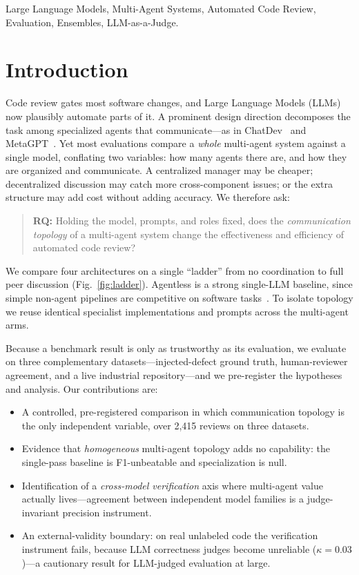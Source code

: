 \documentclass[conference]{IEEEtran}
\begin{document}
\begin{IEEEkeywords}
Large Language Models, Multi-Agent Systems, Automated Code Review, Evaluation,
Ensembles, LLM-as-a-Judge.
\end{IEEEkeywords}

\section{Introduction}
Code review gates most software changes, and Large Language Models (LLMs) now
plausibly automate parts of it. A prominent design direction decomposes the task
among specialized agents that communicate---as in ChatDev~\cite{chatdev} and
MetaGPT~\cite{metagpt}. Yet most evaluations compare a \emph{whole} multi-agent
system against a single model, conflating two variables: how many agents there
are, and how they are organized and communicate. A centralized manager may be
cheaper; decentralized discussion may catch more cross-component issues; or the
extra structure may add cost without adding accuracy. We therefore ask:

\begin{quote}
\textbf{RQ:} Holding the model, prompts, and roles fixed, does the
\emph{communication topology} of a multi-agent system change the effectiveness
and efficiency of automated code review?
\end{quote}

We compare four architectures on a single ``ladder'' from no coordination to
full peer discussion (Fig.~\ref{fig:ladder}). Agentless is a strong single-LLM
baseline, since simple non-agent pipelines are competitive on software
tasks~\cite{agentless}. To isolate topology we reuse identical specialist
implementations and prompts across the multi-agent arms.

Because a benchmark result is only as trustworthy as its evaluation, we evaluate
on three complementary datasets---injected-defect ground truth, human-reviewer
agreement, and a live industrial repository---and we pre-register the hypotheses
and analysis. Our contributions are:
\begin{itemize}
  \item A controlled, pre-registered comparison in which communication topology
  is the only independent variable, over 2{,}415 reviews on three datasets.
  \item Evidence that \emph{homogeneous} multi-agent topology adds no capability:
  the single-pass baseline is F1-unbeatable and specialization is null.
  \item Identification of a \emph{cross-model verification} axis where multi-agent
  value actually lives---agreement between independent model families is a
  judge-invariant precision instrument.
  \item An external-validity boundary: on real unlabeled code the verification
  instrument fails, because LLM correctness judges become unreliable
  ($\kappa{=}0.03$)---a cautionary result for LLM-judged evaluation at large.
\end{itemize}
\end{document}
